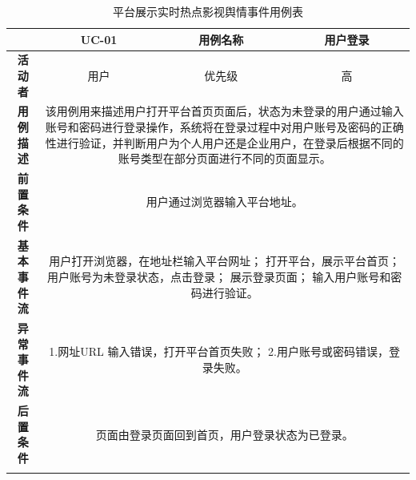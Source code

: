 \begin{longtable}[c]{c|ccc}
	\caption{平台展示实时热点影视舆情事件用例表}
	\label{tab:tab2}\\
	\shline
	\multicolumn{1}{c|}{\textbf{用例编号}} & \multicolumn{1}{c|}{UC-01} & \multicolumn{1}{c|}{用例名称} &  用户登录\\ \hline
	\endhead
	\multicolumn{1}{c|}{\textbf{活动者}} & \multicolumn{1}{c|}{用户} & \multicolumn{1}{c|}{优先级} &高  \\ \hline
	\textbf{用例描述} & \multicolumn{3}{p{12cm}}{该用例用来描述用户打开平台首页页面后，状态为未登录的用户通过输入账号和密码进行登录操作，系统将在登录过程中对用户账号及密码的正确性进行验证，并判断用户为个人用户还是企业用户，在登录后根据不同的账号类型在部分页面进行不同的页面显示。} \\ \hline
	\textbf{前置条件}& \multicolumn{3}{p{12cm}}{用户通过浏览器输入平台地址。} \\ \hline
	\textbf{基本事件流}& \multicolumn{3}{p{12cm}}{用户打开浏览器，在地址栏输入平台网址；\newline
		打开平台，展示平台首页；\newline
		用户账号为未登录状态，点击登录；\newline
		展示登录页面；\newline
		输入用户账号和密码进行验证。} \\ \hline
	\textbf{异常事件流}& \multicolumn{3}{p{12cm}}{1.网址URL 输入错误，打开平台首页失败；\newline
		2.用户账号或密码错误，登录失败。
	} \\ \hline
	\textbf{后置条件}& \multicolumn{3}{p{12cm}}{页面由登录页面回到首页，用户登录状态为已登录。} \\ \shline
\end{longtable}

